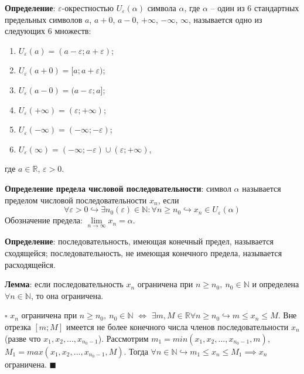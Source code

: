 \documentclass[12pt, a4paper, reqno]{article}
\begin{document}
    \textbf{Определение}: $\varepsilon$-окрестностью $U_{\varepsilon}(\alpha)$ символа $\alpha$, где
    $\alpha$ -- один из 6 стандартных предельных символов $a$, $a + 0$, $a - 0$, $+\infty$, $-\infty$,
    $\infty$, называется одно из следующих 6 множеств:
    \begin{enumerate}
        \item $U_{\varepsilon}(a) = (a - \varepsilon; a + \varepsilon)$;
        \item $U_{\varepsilon}(a + 0) = [a; a + \varepsilon)$;
        \item $U_{\varepsilon}(a - 0) = (a - \varepsilon; a]$;
        \item $U_{\varepsilon}(+\infty) = (\varepsilon; +\infty)$;
        \item $U_{\varepsilon}(-\infty) = (-\infty; -\varepsilon)$;
        \item $U_{\varepsilon}(\infty) = (-\infty; -\varepsilon)\cup(\varepsilon; +\infty)$,
    \end{enumerate}
    где $a\in\mathbb{R}$, $\varepsilon > 0$.

    \textbf{Определение предела числовой последовательности}: символ $\alpha$ называется пределом
    числовой последовательности $x_n$, если
    \begin{equation*}
    \forall \varepsilon > 0 \hookrightarrow \exists n_0(\varepsilon)\in\mathbb{N}:
    \forall n \geq n_0 \hookrightarrow x_n\in U_{\varepsilon}(\alpha)
    \end{equation*}
    Обозначение предела: $\lim\limits_{n\to\infty} x_n = \alpha$.

    \textbf{Определение}: последовательность, имеющая конечный предел, называется сходящейся;
    последовательность, не имеющая конечного предела, называется расходящейся.

    \textbf{Лемма}: если последовательность $x_n$ ограничена при $n \geq n_0,\ n_0\in\mathbb{N}$ и
    определена $\forall n\in\mathbb{N}$, то она ограничена.

    $\square$ $x_n$ ограничена при $n \geq n_0,\ n_0\in\mathbb{N}$ $\iff$ $\exists m, M\in\mathbb{R}
    \forall n \geq n_0 \hookrightarrow m \leq x_n \leq M$. Вне отрезка $[m; M]$ имеется не более
    конечного числа членов последовательности $x_n$ (разве что $x_1, x_2, ..., x_{n_0 - 1}$).
    Рассмотрим $m_1 = min(x_1, x_2, ..., x_{n_0 - 1}, m)$, $M_1 = max(x_1, x_2, ..., x_{n_0 - 1}, M)$.
    Тогда $\forall n\in\mathbb{N} \hookrightarrow m_1 \leq x_n \leq M_1 \implies x_n$ ограничена.
    $\blacksquare$
\end{document}
